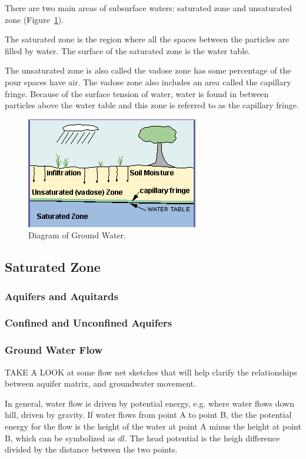\documentclass{book}\usepackage{knitr}
\begin{document}
There are two main areas of subsurface waters: saturated zone and unsaturated zone (Figure~\ref{fig:groundwater}).

The saturated zone is the region where all the spaces between the particles are filled by water. The surface of the saturated zone is the water table. 

The unsaturated zone is also called the vadose zone has some percentage of the pour spaces have air. The vadose zone also includes an area called the capillary fringe. Because of the surface tension of water, water is found in between particles above the water table and this zone is referred to as the capillary fringe. 

\begin{figure}
\includegraphics{images/critical-zone/groundwater}
\caption{Diagram of Ground Water. }
\label{fig:groundwater}
\end{figure}

\subsection{Saturated Zone}

\subsubsection{Aquifers and Aquitards}

\subsubsection{Confined and Unconfined Aquifers}

\subsubsection{Ground Water Flow}

TAKE A LOOK at some flow net sketches that will help clarify the relationships between aquifer matrix, and groundwater movement.

In general, water flow is driven by potential energy, e.g.  where water flows down hill, driven by gravity. If water flows from point A to point B, the the potential energy for the flow is the height of the water at point A minus the height at point B, which can be symbolized as $dl$. The head potential is the heigh difference divided by the distance between the two points.  
\end{document}
